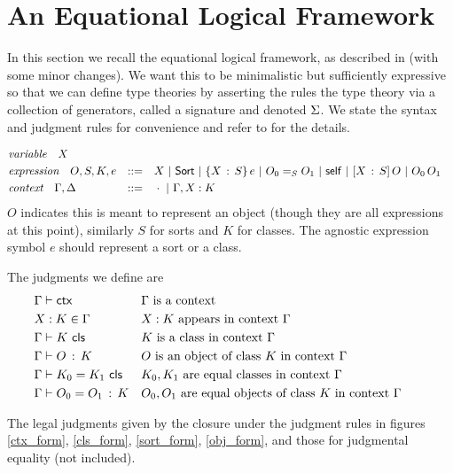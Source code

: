 \section{An Equational Logical Framework}
In this section we recall the equational logical framework,
as described in \cite{harper2021equational} (with some minor changes).
We want this to be minimalistic but sufficiently expressive so that we can define type theories by asserting the rules the type theory
via a collection of generators, called a signature and denoted $\Si$.
We state the syntax and judgment rules for convenience and refer to \cite{harper2021equational} for the details.

\begin{align*}
  &\textit{variable} \quad X  \\
  &\textit{expression} \quad O, S, K, e &::= \quad & X \BNFSep \SortCS \BNFSep \PiCS{X}{S}{e}
                                     \BNFSep \EqCS{S}{O_{0}}{O_{1}} \BNFSep \SelfCS \BNFSep \LamCS{X}{S}{O} \BNFSep \ApCS{O_{0}}{O_{1}} \\
  &\textit{context} \quad \Ga, \De &::= \quad & \cdot \BNFSep \CtxExt{\Ga}{X}{K}
\end{align*}
$O$ indicates this is meant to represent an object
(though they are all expressions at this point),
similarly $S$ for sorts and $K$ for classes.
The agnostic expression symbol $e$ should represent a sort or a class.

The judgments we define are
\begin{align*}
  &\CtxJdg{\Ga} && \Ga \text{ is a context }  \\
  &X:K \in \Ga && X:K \text{ appears in context } \Ga \\
  &\ClsJdg{\Ga}{K} && K \text{ is a class in context } \Ga \\
  &\ObjJdg{\Ga}{O}{K} && O \text{ is an object of class } K
    \text{ in context } \Ga && \\
  &\IdClsJdg{\Ga}{K_{0}}{K_{1}} && K_{0}, K_{1}
    \text{ are equal classes in context } \Ga \\
  &\IdObjJdg{\Ga}{O_{0}}{O_{1}}{K} && O_{0},O_{1}
    \text{ are equal objects of class } K
    \text{ in context } \Ga
\end{align*}

The legal judgments given by the closure under the judgment rules
in figures \ref{ctx_form}, \ref{cls_form}, \ref{sort_form}, \ref{obj_form},
and those for judgmental equality (not included).

